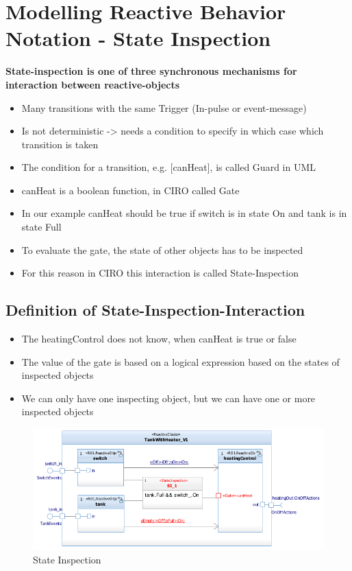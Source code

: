 \hypertarget{modelling-reactive-behavior-notation---state-inspection}{%
\section{Modelling Reactive Behavior Notation - State
Inspection}\label{modelling-reactive-behavior-notation---state-inspection}}

\textbf{State-inspection is one of three synchronous mechanisms for interaction between reactive-objects}

\begin{itemize}
\tightlist
\item
  Many transitions with the same Trigger (In-pulse or event-message)
\item
  Is not deterministic -\textgreater{} needs a condition to specify in
  which case which transition is taken
\item
  The condition for a transition, e.g. {[}canHeat{]}, is called Guard in
  UML
\item
  canHeat is a boolean function, in CIRO called Gate
\item
  In our example canHeat should be true if switch is in state On and
  tank is in state Full
\item
  To evaluate the gate, the state of other objects has to be inspected
\item
  For this reason in CIRO this interaction is called State-Inspection
\end{itemize}

\hypertarget{definition-of-state-inspection-interaction}{%
\subsection{Definition of
State-Inspection-Interaction}\label{definition-of-state-inspection-interaction}}

\begin{itemize}
\tightlist
\item
  The heatingControl does not know, when canHeat is true or false
\item
  The value of the gate is based on a logical expression based on the
  states of inspected objects
\item
  We can only have one inspecting object, but we can have one or more
  inspected objects
\end{itemize}

\begin{figure}[H]
\centering
\includegraphics[width=1\textwidth]{figures/gateStateInspection.png}
\caption{State Inspection}
\end{figure}

